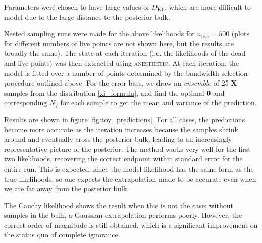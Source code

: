 \documentclass[usenatbib]{mnras} %
\newcommand{\thetab}{\bm{\theta}}
\newcommand{\nlive}{n_\mathrm{live}}
\newcommand{\DKL}{D_\mathrm{KL}}
\begin{document}
Parameters were chosen to have large values of $\DKL$, which are more difficult to model due to the large distance to the posterior bulk.
\par
Nested sampling runs were made for the above likelihoods for $\nlive = 500$ (plots for different numbers of live points are not shown here, but the results are broadly the same). The state at each iteration (i.e. the likelihoods of the dead and live points) was then extracted using \textsc{anesthetic}. At each iteration, the model is fitted over a number of points determined by the bandwidth selection procedure outlined above. For the error bars, we draw an \textit{ensemble} of 25 $\bm{X}$ samples from the distribution \eqref{xi_formula}, and find the optimal $\thetab$ and corresponding  $N_f$ for each sample to get the mean and variance of the prediction. 
\par
Results are shown in figure \ref{fig:toy_predictions}. For all cases, the predictions become more accurate as the iteration increases because the samples shrink around and eventually cross the posterior bulk, leading to an increasingly representative picture of the posterior. The method works very well for the first two likelihoods, recovering the correct endpoint within standard error for the entire run. This is expected, since the model likelihood has the same form as the true likelihoods, so one expects the extrapolation made to be accurate even when we are far away from the posterior bulk.
\par
The Cauchy likelihood shows the result when this is not the case; without samples in the bulk, a Gaussian extrapolation performs poorly. However, the correct order of magnitude is still obtained, which is a significant improvement on the status quo of complete ignorance. 
\end{document}

